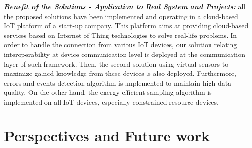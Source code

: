 \textbf{\textit{Benefit of the Solutions - Application to Real System and Projects: }}
all the proposed solutions have been implemented and operating in a cloud-based IoT platform of a start-up company. This platform aims at providing cloud-based services based on Internet of Thing technologies to solve real-life problems. 
In order to handle the connection from various IoT devices, our solution relating interoperability at device communication level is deployed at the communication layer of such framework. Then, the second solution using virtual sensors to maximize gained knowledge from these devices is also deployed. Furthermore, errors and events detection algorithm is implemented to maintain high data quality. On the other hand, the energy efficient sampling algorithm is implemented on all IoT devices, especially constrained-resource devices. 

\section{Perspectives and Future work}

